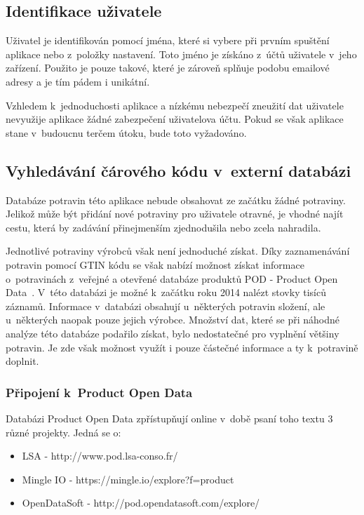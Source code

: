 \documentclass[thesis=B,czech]{FITthesis}[2013/10/20]
\begin{document}
\clearpage

\subsection{Identifikace uživatele}

Uživatel je identifikován pomocí jména, které si vybere při prvním spuštění aplikace nebo z~položky nastavení. Toto jméno je získáno z~účtů uživatele v~jeho zařízení. Použito je pouze takové, které je zároveň splňuje podobu emailové adresy a je tím pádem i unikátní.

Vzhledem k~jednoduchosti aplikace a nízkému nebezpečí zneužití dat uživatele nevyužije aplikace žádné zabezpečení uživatelova účtu. Pokud se však aplikace stane v~budoucnu terčem útoku, bude toto vyžadováno.

\subsection{Vyhledávání čárového kódu v~externí databázi}

Databáze potravin této aplikace nebude obsahovat ze začátku žádné potraviny. Jelikož může být přidání nové potraviny pro uživatele otravné, je vhodné najít cestu, která by zadávání přinejmenším zjednodušila nebo zcela nahradila.

Jednotlivé potraviny výrobců však není jednoduché získat. Díky zaznamenávání potravin pomocí GTIN kódu se však nabízí možnost získat informace o~potravinách z~veřejné a otevřené databáze produktů POD - Product Open Data~\cite{pod}. V~této databázi je možné k~začátku roku 2014 nalézt stovky tisíců záznamů. Informace v~databázi obsahují u~některých potravin složení, ale u~některých naopak pouze jejich výrobce. Množství dat, které se při náhodné analýze této databáze podařilo získat, bylo nedostatečné pro vyplnění většiny potravin. Je zde však možnost využít i pouze částečné informace a ty k~potravině doplnit.

\subsubsection{Připojení k~Product Open Data}

Databázi Product Open Data zpřístupňují online v~době psaní toho textu 3 různé projekty. Jedná se o:
\begin{itemize}
  \item{LSA - http://www.pod.lsa-conso.fr/}
  \item{Mingle IO - https://mingle.io/explore?f=product}
  \item{OpenDataSoft - http://pod.opendatasoft.com/explore/}
\end{itemize}
\end{document}
